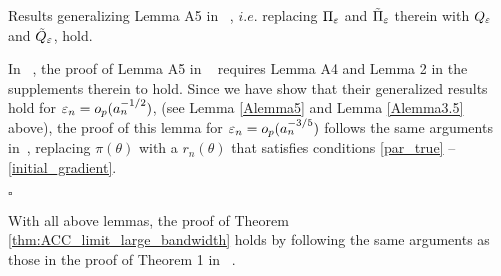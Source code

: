 \begin{lemma}\label{Alemma6} Results generalizing Lemma A5 in ~\cite{Li2017},
	$i.e.$ replacing $\Pi_{\varepsilon}$ and $\tilde{\Pi}_{\varepsilon}$ therein with
	$Q_{\varepsilon}$ and $\tilde{Q}_{\varepsilon}$, hold. \end{lemma} 
	In ~\cite{Li2017}, the proof of Lemma A5 in ~\cite{Li2017} requires Lemma A4 and Lemma 2 in the supplements therein to hold. Since we have show that their generalized results hold for $\varepsilon_{n}=o_{p}(a_{n}^{-1/2})$, (see Lemma \ref{Alemma5} and Lemma \ref{Alemma3.5} above),
    the proof of this lemma for $\varepsilon_{n}=o_{p}(a_{n}^{-3/5})$ follows the same arguments in~\cite{Li2017}, replacing $\pi(\theta)$ with a $r_n(\theta)$ that satisfies conditions \ref{par_true} -- \ref{initial_gradient}.

 	\hfill{$\square$} 


	

With all above lemmas, the proof of Theorem \ref{thm:ACC_limit_large_bandwidth} holds by following the same arguments as those in the proof of Theorem 1 in ~\cite{Li2017}.



%
%	

%